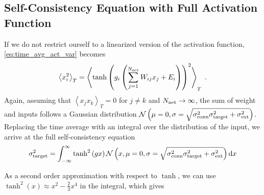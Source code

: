 \documentclass[10pt,a4paper]{article}
\newcommand{\avgt}[1]{\left< #1 \right>_T}
\begin{document}
\subsection{Self-Consistency Equation with Full Activation Function}
If we do not restrict ourself to a linearized version of the activation function, \eqref{eq:time_avg_act_var} becomes
\begin{equation}
	\avgt{x_i^2} = \avgt{\tanh\left(g_i\left(\sum_{j=1}^{N_{\rm net}} W_{ij} x_j + E_i\right)\right)^2} \; .
\end{equation}
Again, assuming that $\avgt{x_j x_k}=0$ for $j\neq k$ and $N_{\rm net} \rightarrow \infty$, the sum of weight and inputs follows a Gaussian distribution $\mathcal{N}\left(\mu = 0, \sigma = \sqrt{\sigma^2_{\rm conn}\sigma^2_{\rm target} + \sigma^2_{\rm ext}}\right)$. Replacing the time average with an integral over the distribution of the input, we arrive at the full self-consistency equation
\begin{equation}
	\sigma^2_{\rm target} = \int_{-\infty}^{\infty}  \tanh^2\left(gx\right) \mathcal{N}\left(x, \mu = 0, \sigma = \sqrt{\sigma^2_{\rm conn}\sigma^2_{\rm target} + \sigma^2_{\rm ext}}\right)	\mathrm{d}x \label{eq:self-consistency_var_full}
\end{equation}

As a second order approximation with respect to $\tanh$, we can use $\tanh^2(x) \approx x^2 - \frac{2}{3} x^4$ in the integral, which gives
\end{document}
